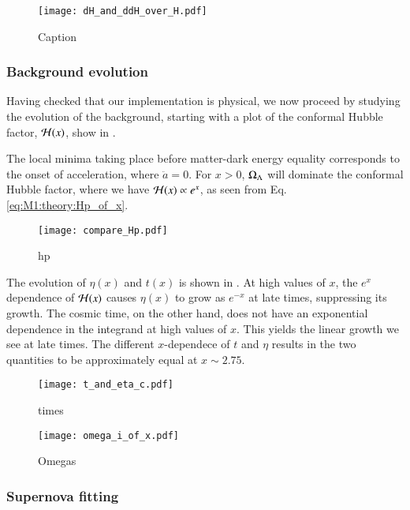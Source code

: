 \begin{figure}[ht!]
    \texttt{[image: dH\_and\_ddH\_over\_H.pdf]}
    \caption{Caption}
    \label{fig:M1:dH_ddH_over_H}
\end{figure}


\subsubsection{Background evolution }
Having checked that our implementation is physical, we now proceed by studying the evolution of the background, starting with a plot of the conformal Hubble factor, $\mathcal{H}(x)$, show in .

The local minima taking place before matter-dark energy equality corresponds to the onset of acceleration, where $\ddot{a}=0$. For $x>0$, $\Omega_{\Lambda}$ will dominate the conformal Hubble factor, where we have $\mathcal{H}(x)\propto e^x$, as seen from Eq. \eqref{eq:M1:theory:Hp_of_x}. 
\begin{figure}[ht!]
    \texttt{[image: compare\_Hp.pdf]}
    \caption{hp}
    \label{fig:M1:Hp_of_x}
\end{figure}

The evolution of $\eta(x)$ and $t(x)$ is shown in . At high values of $x$, the $e^x$ dependence of $\mathcal{H}(x)$ causes $\eta(x)$ to grow as $e^{-x}$ at late times, suppressing its growth. The cosmic time, on the other hand, does not have an exponential dependence in the integrand at high values of $x$. This yields the linear growth we see at late times. The different $x$-dependece of $t$ and $\eta$ results in the two quantities to be approximately equal at $x\sim2.75$.    


\begin{figure}[ht!]
    \texttt{[image: t\_and\_eta\_c.pdf]} 
    \caption{times}
    \label{fig:M1:t_and_eta_of_x}
\end{figure}


\begin{figure}[ht!]
    \texttt{[image: omega\_i\_of\_x.pdf]}
    \caption{Omegas}
    \label{fig:M1:Omegas}
\end{figure}



\subsubsection{Supernova fitting}

